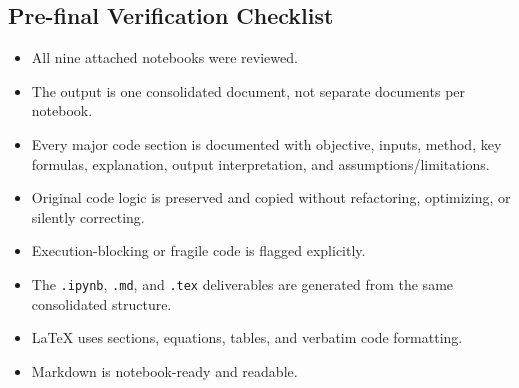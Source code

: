 \documentclass[
  11pt,
]{article}
\providecommand{\tightlist}{%
  \setlength{\itemsep}{0pt}\setlength{\parskip}{0pt}}
\begin{document}
\subsection{Pre-final Verification Checklist}\label{pre-final-verification-checklist}

\begin{itemize}
\tightlist
\item
  All nine attached notebooks were reviewed.
\item
  The output is one consolidated document, not separate documents per notebook.
\item
  Every major code section is documented with objective, inputs, method, key formulas, explanation, output interpretation, and assumptions/limitations.
\item
  Original code logic is preserved and copied without refactoring, optimizing, or silently correcting.
\item
  Execution-blocking or fragile code is flagged explicitly.
\item
  The \texttt{.ipynb}, \texttt{.md}, and \texttt{.tex} deliverables are generated from the same consolidated structure.
\item
  LaTeX uses sections, equations, tables, and verbatim code formatting.
\item
  Markdown is notebook-ready and readable.
\end{itemize}
\end{document}
